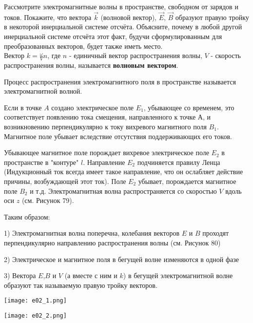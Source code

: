 \documentclass[__main__.tex]{subfiles}
\begin{document}
Рассмотрите электромагнитные волны в пространстве, свободном от зарядов и токов. Покажите, что вектора $\vec{k}$ (волновой вектор), $\vec{E}$, $\vec{B}$ образуют правую тройку в некоторой инерциальной системе отсчёта. Объясните, почему в любой другой инерциальной системе отсчёта этот факт, будучи сформулированным для преобразованных векторов, будет также иметь место.\\ 

Вектор $k = \frac{\omega}{V} n$, где $n$ - единичный вектор распространения волны, $V$ - скорость распространения волны, называется \textbf{волновым вектором}.


Процесс распространения электромагнитного поля в пространстве называется электромагнитной волной. 


Если в точке $A$ создано электрическое поле $E_1$, убывающее со временем, это соответствует появлению тока смещения, направленного к точке А, и возникновению перпендикулярно к току вихревого магнитного поля $B_1$. Магнитное поле убывает вследствие отсутствия поддерживающих его токов.

Убывающее магнитное поле порождает вихревое электрическое поле $E_2$ в пространстве в "контуре" $l$. Направление $E_2$ подчиняется правилу Ленца (Индукционный ток всегда имеет такое направление, что он ослабляет действие причины, возбуждающей этот ток). Поле $E_2$ убывает, порождается магнитное поле $B_2$ и т.д. Электромагнитная волна распространяется со скоростью $V$ вдоль оси $z$ (см. Рисунок 79). 

Таким образом:

1) Электромагнитная волна поперечна, колебания векторов $E$ и $B$ проходят перпендикулярно направлению распространения волны (см. Рисунок 80)

2) Электрическое и магнитное поля в бегущей волне изменяются в одной фазе

3) Вектора $E$,$B$ и $V$ (а вместе с ним и $k$) в бегущей электромагнитной волне образуют так называемую правую тройку векторов.

\begin{center}
	\texttt{[image: e02\_1.png]}
\end{center}

\begin{center}
	\texttt{[image: e02\_2.png]}
\end{center}

\end{document}
